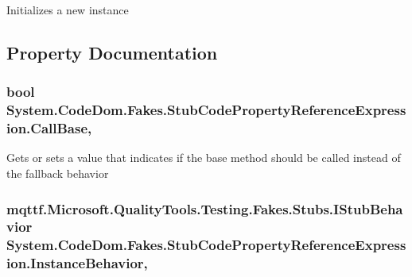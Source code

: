 Initializes a new instance



\subsection{Property Documentation}
\hypertarget{class_system_1_1_code_dom_1_1_fakes_1_1_stub_code_property_reference_expression_a535a97dd805392b7bf6e6e10b6b6ef75}{
\subsubsection[{Call\-Base}]{\setlength{\rightskip}{0pt plus 5cm}bool System.\-Code\-Dom.\-Fakes.\-Stub\-Code\-Property\-Reference\-Expression.\-Call\-Base\hspace{0.3cm}{\ttfamily [get]}, {\ttfamily [set]}}}\label{class_system_1_1_code_dom_1_1_fakes_1_1_stub_code_property_reference_expression_a535a97dd805392b7bf6e6e10b6b6ef75}


Gets or sets a value that indicates if the base method should be called instead of the fallback behavior

\hypertarget{class_system_1_1_code_dom_1_1_fakes_1_1_stub_code_property_reference_expression_a0863b69d4639a83e61cdc262984de78e}{
\subsubsection[{Instance\-Behavior}]{\setlength{\rightskip}{0pt plus 5cm}mqttf.\-Microsoft.\-Quality\-Tools.\-Testing.\-Fakes.\-Stubs.\-I\-Stub\-Behavior System.\-Code\-Dom.\-Fakes.\-Stub\-Code\-Property\-Reference\-Expression.\-Instance\-Behavior\hspace{0.3cm}{\ttfamily [get]}, {\ttfamily [set]}}}\label{class_system_1_1_code_dom_1_1_fakes_1_1_stub_code_property_reference_expression_a0863b69d4639a83e61cdc262984de78e}


